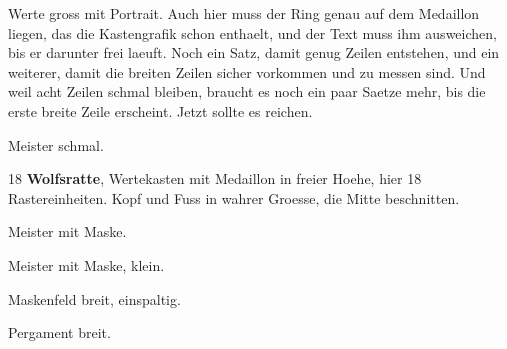 \documentclass[raster,ohnehintergrund]{dsa5latex}
\begin{document}
\begin{dsaWerteGrossPortrait}[dsaportrait=grafiken/portraitrahmen]
\dsaPortraitfluss
Werte gross mit Portrait. Auch hier muss der Ring genau auf dem Medaillon
liegen, das die Kastengrafik schon enthaelt, und der Text muss ihm
ausweichen, bis er darunter frei laeuft. Noch ein Satz, damit genug Zeilen
entstehen, und ein weiterer, damit die breiten Zeilen sicher vorkommen und
zu messen sind. Und weil acht Zeilen schmal bleiben, braucht es noch ein
paar Saetze mehr, bis die erste breite Zeile erscheint. Jetzt sollte es
reichen.
\end{dsaWerteGrossPortrait}
\clearpage

\begin{dsaMeisterSchmal}
Meister schmal.
\end{dsaMeisterSchmal}
\clearpage

\begin{dsaWerteFreiPortrait}[dsaportrait=grafiken/aventurienkarte]{18}
{\bfseries Wolfsratte}, Wertekasten mit Medaillon in freier Hoehe, hier
18 Rastereinheiten. Kopf und Fuss in wahrer Groesse, die Mitte beschnitten.
\end{dsaWerteFreiPortrait}

\begin{dsaMeisterMaske}
Meister mit Maske.
\end{dsaMeisterMaske}
\clearpage

\begin{dsaMeisterMaskeKlein}
Meister mit Maske, klein.
\end{dsaMeisterMaskeKlein}
\clearpage

\onecolumn
\begin{dsaMeisterBreit}
Maskenfeld breit, einspaltig.
\end{dsaMeisterBreit}
\clearpage
\twocolumn

\begin{dsaPergamentBreit}
Pergament breit.
\end{dsaPergamentBreit}
\end{document}
